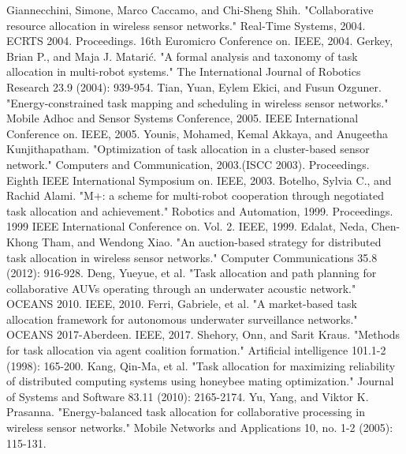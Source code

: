 \documentclass[conference]{IEEEtran}
\begin{document}




\begin{thebibliography}{1}
\bibitem{}
Giannecchini, Simone, Marco Caccamo, and Chi-Sheng Shih. "Collaborative resource allocation in wireless sensor networks." Real-Time Systems, 2004. ECRTS 2004. Proceedings. 16th Euromicro Conference on. IEEE, 2004.
\bibitem{}
Gerkey, Brian P., and Maja J. Matarić. "A formal analysis and taxonomy of task allocation in multi-robot systems." The International Journal of Robotics Research 23.9 (2004): 939-954.
\bibitem{}
Tian, Yuan, Eylem Ekici, and Fusun Ozguner. "Energy-constrained task mapping and scheduling in wireless sensor networks." Mobile Adhoc and Sensor Systems Conference, 2005. IEEE International Conference on. IEEE, 2005.
\bibitem{}
Younis, Mohamed, Kemal Akkaya, and Anugeetha Kunjithapatham. "Optimization of task allocation in a cluster-based sensor network." Computers and Communication, 2003.(ISCC 2003). Proceedings. Eighth IEEE International Symposium on. IEEE, 2003.
\bibitem{}
Botelho, Sylvia C., and Rachid Alami. "M+: a scheme for multi-robot cooperation through negotiated task allocation and achievement." Robotics and Automation, 1999. Proceedings. 1999 IEEE International Conference on. Vol. 2. IEEE, 1999.
\bibitem{}
Edalat, Neda, Chen-Khong Tham, and Wendong Xiao. "An auction-based strategy for distributed task allocation in wireless sensor networks." Computer Communications 35.8 (2012): 916-928.
\bibitem{}
Deng, Yueyue, et al. "Task allocation and path planning for collaborative AUVs operating through an underwater acoustic network." OCEANS 2010. IEEE, 2010.
\bibitem{}
Ferri, Gabriele, et al. "A market-based task allocation framework for autonomous underwater surveillance networks." OCEANS 2017-Aberdeen. IEEE, 2017.
\bibitem{}
Shehory, Onn, and Sarit Kraus. "Methods for task allocation via agent coalition formation." Artificial intelligence 101.1-2 (1998): 165-200.
\bibitem{}
Kang, Qin-Ma, et al. "Task allocation for maximizing reliability of distributed computing systems using honeybee mating optimization." Journal of Systems and Software 83.11 (2010): 2165-2174.
\bibitem{}
Yu, Yang, and Viktor K. Prasanna. "Energy-balanced task allocation for collaborative processing in wireless sensor networks." Mobile Networks and Applications 10, no. 1-2 (2005): 115-131.
\end{thebibliography}
\end{document}
